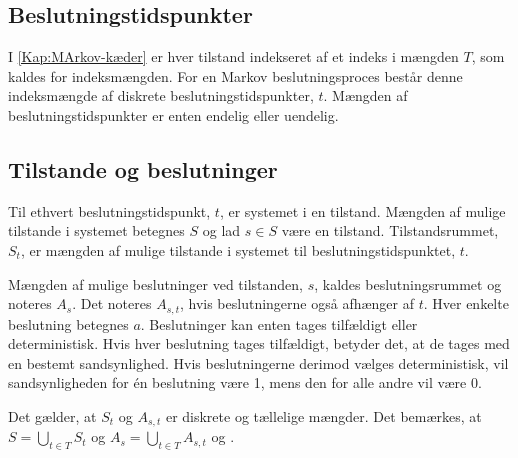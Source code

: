 

\subsection{Beslutningstidspunkter}
I \autoref{Kap:MArkov-kæder} er hver tilstand indekseret af et indeks i mængden $T$, som kaldes for indeksmængden. For en Markov beslutningsproces består denne indeksmængde af diskrete beslutningstidspunkter, $t$. Mængden af beslutningstidspunkter er enten endelig eller uendelig. %


\subsection{Tilstande og beslutninger}
Til ethvert beslutningstidspunkt, $t$, er systemet i en tilstand. Mængden af mulige tilstande i systemet betegnes $S$ og lad $s\in S$ være en tilstand. Tilstandsrummet, $S_t$, er mængden af mulige tilstande i systemet til beslutningstidspunktet, $t$. 

Mængden af mulige beslutninger ved tilstanden, $s$, kaldes beslutningsrummet og noteres $A_s$. Det noteres $A_{s,t}$, hvis beslutningerne også afhænger af $t$. Hver enkelte beslutning betegnes $a$. Beslutninger kan enten tages tilfældigt eller deterministisk. Hvis hver beslutning tages tilfældigt, betyder det, at de tages med en bestemt sandsynlighed. Hvis beslutningerne derimod vælges deterministisk, vil sandsynligheden for én beslutning være 1, mens den for alle andre vil være 0.


Det gælder, at $S_t$ og $A_{s,t}$ er diskrete og tællelige mængder. Det bemærkes, at \\$S=\displaystyle \bigcup_{t\in T}S_t$ og $A_s=\displaystyle\bigcup_{t\in T}A_{s,t}$ og .


